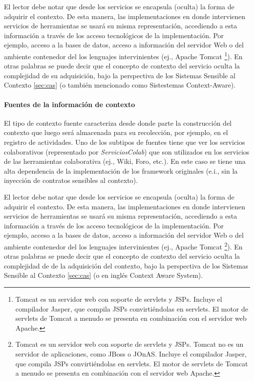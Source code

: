 El lector debe notar que desde los servicios se encapsula (oculta) la forma de
adquirir el contexto. De esta manera, las implementaciones en
donde intervienen servicios de herramientas se usará su misma
representación, accediendo a esta información a través de los acceso
tecnológicos de la implementación. Por ejemplo, acceso a la bases de datos,
acceso a información del servidor Web o del ambiente contenedor del los
lenguajes intervinientes (ej., Apache Tomcat \footnote{Tomcat es un servidor web
con soporte de servlets y JSPs. Incluye el compilador Jasper, que compila JSPs
convirtiéndolas en
servlets. El motor de servlets de Tomcat a menudo se presenta en combinación con
el servidor web Apache.}). En otras palabras se puede decir que el concepto de
contexto del servicio oculta la complejidad de su adquisición,
bajo la perspectiva de los Sistemas Sensible al Contexto \ref{sec:cas} (o
también mencionado como Sistestemas Context-Aware).



\paragraph{Fuentes de la información de contexto}

El tipo de contexto fuente caracteriza desde donde parte la construcción del
contexto que luego será almacenada para su recolección, por ejemplo, en el
registro de actividades. Uno de los subtipos de fuentes tiene que ver los
servicios colaborativos (representado por \textit{ServiciosColab}) que son
utilizados en los servicios de las herramientas colaborativa (ej., Wiki, Foro,
etc.).
En este caso se tiene una alta dependencia de la implementación de los
framework originales (e.i., sin la inyección de contratos sensibles al
contexto). 

El lector debe notar que desde los servicios se encapsula (oculta) la forma de
adquirir el contexto. De esta manera, las implementaciones en
donde intervienen servicios de herramientas se usará su misma
representación, accediendo a esta información a través de los acceso
tecnológicos de la implementación. Por ejemplo, acceso a la bases de datos,
acceso a información del servidor Web o del ambiente contenedor del los
lenguajes intervinientes (ej., Apache Tomcat \footnote{Tomcat es un servidor web
con soporte de servlets y JSPs. Tomcat no es un servidor de aplicaciones, como
JBoss o JOnAS. Incluye el compilador Jasper, que compila JSPs convirtiéndolas en
servlets. El motor de servlets de Tomcat a menudo se presenta en combinación con
el servidor web Apache.}). En otras palabras se puede decir que el concepto de
contexto del servicio oculta la complejidad de de la adquisición del contexto,
bajo la perspectiva de los Sistemas Sensible al Contexto \ref{sec:cas} (o en
inglés Context Aware System).



